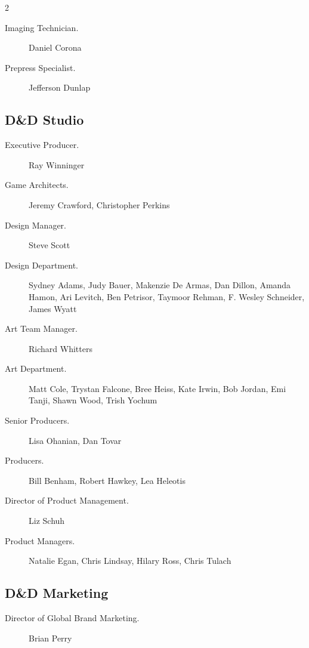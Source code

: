 \documentclass[10pt,a4paper,twoside,bg=print,twocolumn,openany,nodeprecatedcode]{dndbook}
\begin{document}
\begin{description}
\begin{multicols}{2}
\begin{description}
\item[Imaging Technician.]
Daniel Corona

\item[Prepress Specialist.]
Jefferson Dunlap

\end{description}

\subsection{D\&D Studio}

\begin{description}
\item[Executive Producer.]
Ray Winninger

\item[Game Architects.]
Jeremy Crawford, Christopher Perkins

\item[Design Manager.]
Steve Scott

\item[Design Department.]
Sydney Adams, Judy Bauer, Makenzie De Armas, Dan Dillon, Amanda Hamon, Ari Levitch, Ben Petrisor, Taymoor Rehman, F. Wesley Schneider, James Wyatt

\item[Art Team Manager.]
Richard Whitters

\item[Art Department.]
Matt Cole, Trystan Falcone, Bree Heiss, Kate Irwin, Bob Jordan, Emi Tanji, Shawn Wood, Trish Yochum

\item[Senior Producers.]
Lisa Ohanian, Dan Tovar

\item[Producers.]
Bill Benham, Robert Hawkey, Lea Heleotis

\item[Director of Product Management.]
Liz Schuh

\item[Product Managers.]
Natalie Egan, Chris Lindsay, Hilary Ross, Chris Tulach

\end{description}

\subsection{D\&D Marketing}

\begin{description}
\item[Director of Global Brand Marketing.]
Brian Perry


\end{description}
\end{multicols}
\end{description}
\end{document}
